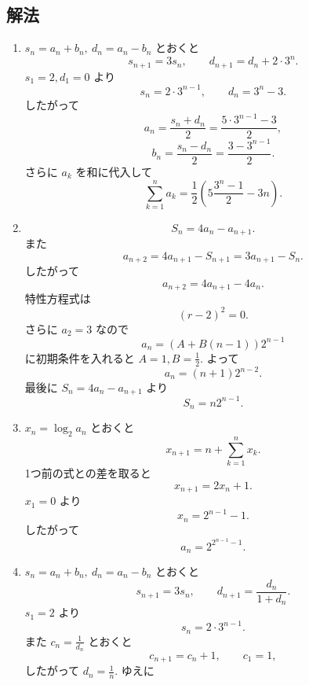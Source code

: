     \subsection{解法}\label{節：高難易度のもの：解法}
      \begin{enumerate}[label=\textbf{問\arabic*.},leftmargin=3.8em,format=\bookitemlink{practice-advanced}{solution}{problem}]
        \item \(s_n=a_n+b_n,\ d_n=a_n-b_n\) とおくと
          \[
            s_{n+1}=3s_n,\qquad d_{n+1}=d_n+2\cdot3^n.
          \]
              \(s_1=2,d_1=0\) より
          \[
            s_n=2\cdot3^{n-1},\qquad d_n=3^n-3.
          \]
              したがって
          \[
            a_n=\frac{s_n+d_n}{2}
            =\frac{5\cdot3^{n-1}-3}{2},
          \]
          \[
            b_n=\frac{s_n-d_n}{2}
            =\frac{3-3^{n-1}}2.
          \]
              さらに \(a_k\) を和に代入して
          \[
            \sum_{k=1}^{n}a_k
            =\frac12\left(5\frac{3^n-1}{2}-3n\right).
          \]
        \item \[
            S_n=4a_n-a_{n+1}.
          \]
              また
          \[
            a_{n+2}=4a_{n+1}-S_{n+1}
            =3a_{n+1}-S_n.
          \]
              したがって
          \[
            a_{n+2}=4a_{n+1}-4a_n.
          \]
              特性方程式は
          \[
            (r-2)^2=0.
          \]
              さらに \(a_2=3\) なので
          \[
            a_n=(A+B(n-1))2^{n-1}
          \]
              に初期条件を入れると \(A=1,B=\displaystyle \frac{1}{2}\). よって
          \[
            a_n=(n+1)2^{n-2}.
          \]
              最後に \(S_n=4a_n-a_{n+1}\) より
          \[
            S_n=n2^{n-1}.
          \]
        \item \(x_n=\log_2a_n\) とおくと
          \[
            x_{n+1}=n+\sum_{k=1}^{n}x_k.
          \]
              1つ前の式との差を取ると
          \[
            x_{n+1}=2x_n+1.
          \]
              \(x_1=0\) より
          \[
            x_n=2^{n-1}-1.
          \]
              したがって
          \[
            a_n=2^{2^{n-1}-1}.
          \]
        \item \(s_n=a_n+b_n,\ d_n=a_n-b_n\) とおくと
          \[
            s_{n+1}=3s_n,\qquad
            d_{n+1}=\frac{d_n}{1+d_n}.
          \]
              \(s_1=2\) より
          \[
            s_n=2\cdot3^{n-1}.
          \]
              また \(c_n=\displaystyle \frac{1}{d_n}\) とおくと
          \[
            c_{n+1}=c_n+1,\qquad c_1=1,
          \]
              したがって \(d_n=\displaystyle \frac{1}{n}\). ゆえに

\end{enumerate}
